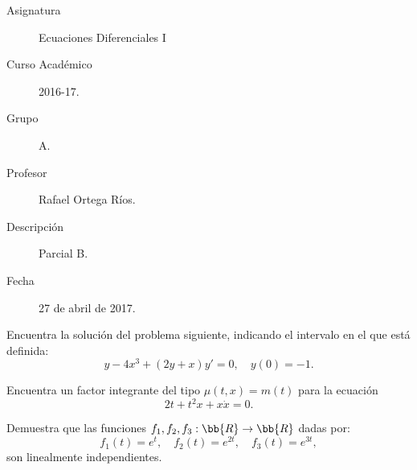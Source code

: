 \documentclass[12pt]{article}
\begin{document}

    
    

    \begin{description}
        \item[Asignatura] Ecuaciones Diferenciales I
        \item[Curso Académico] 2016-17.
        \item[Grupo] A.
        \item[Profesor] Rafael Ortega Ríos.
        \item[Descripción] Parcial B.
        \item[Fecha] 27 de abril de 2017.
    
    \end{description}
    \newpage

\begin{ejercicio}
    Encuentra la solución del problema siguiente, indicando el intervalo en el que está definida:
    \begin{equation*}
        y - 4x^3 + (2y + x)y' = 0, \quad y(0) = -1.
    \end{equation*}
\end{ejercicio}

\begin{ejercicio}
    Encuentra un factor integrante del tipo $\mu(t,x) = m(t)$ para la ecuación
    \begin{equation*}
        2t + t^2x + x\dot{x} = 0.
    \end{equation*}
\end{ejercicio}

\begin{ejercicio}
    Demuestra que las funciones $f_1,f_2,f_3:\bb{R}\to \bb{R}$ dadas por:
    \begin{equation*}
        f_1(t) = e^t, \quad f_2(t) = e^{2t}, \quad f_3(t) = e^{3t},
    \end{equation*}
    son linealmente independientes.
\end{ejercicio}
\end{document}
